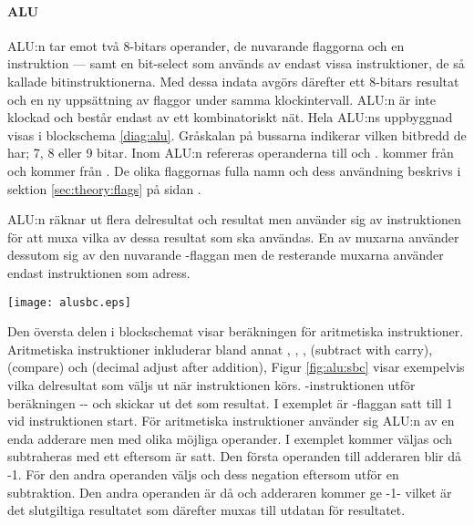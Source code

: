 \documentclass[main.tex]{subfiles}
\begin{document}
\paragraph{ALU}
ALU:n tar emot två 8-bitars operander, de nuvarande flaggorna och en
instruktion --- samt en bit-select som används av endast vissa instruktioner,
de så kallade bitinstruktionerna. Med dessa indata avgörs därefter ett 8-bitars
resultat och en ny uppsättning av flaggor under samma klockintervall. ALU:n är
inte klockad och består endast av ett kombinatoriskt nät. Hela ALU:ns
uppbyggnad visas i blockschema \ref{diag:alu}. Gråskalan på bussarna indikerar
vilken bitbredd de har; 7, 8 eller 9 bitar. Inom ALU:n refereras operanderna
till  och .  kommer från  och
 kommer från . De olika flaggornas fulla namn och dess
användning beskrivs i sektion \ref{sec:theory:flags} på sidan
\pageref{sec:theory:flags}.

ALU:n räknar ut flera delresultat och resultat men använder sig av
instruktionen för att muxa vilka av dessa resultat som ska användas. En av
muxarna använder dessutom sig av den nuvarande -flaggan men de
resterande muxarna använder endast instruktionen som adress.

\begin{SCfigure}
    \centering
    \texttt{[image: alusbc.eps]}
    \caption{Resultat och delresultat som muxas då -instruktionen
    utförs och -flaggan är satt.}
    \label{fig:alu:sbc}
\end{SCfigure}

Den översta delen i blockschemat visar beräkningen för aritmetiska
instruktioner. Aritmetiska instruktioner inkluderar bland annat ,
, ,  (subtract with carry),  (compare)
och  (decimal adjust after addition), Figur \ref{fig:alu:sbc} visar
exempelvis vilka delresultat som väljs ut när instruktionen  körs.
-instruktionen utför beräkningen -- och
skickar ut det som resultat. I exemplet är -flaggan satt till 1 vid
instruktionen start. För aritmetiska instruktioner använder sig ALU:n av en
enda adderare men med olika möjliga operander. I exemplet kommer 
väljas och subtraheras med ett eftersom  är satt. Den första operanden
till adderaren blir då -1. För den andra operanden väljs 
och dess negation eftersom  utför en subtraktion.  Den andra
operanden är då  och adderaren kommer ge -1-
vilket är det slutgiltiga resultatet som därefter muxas till utdatan för
resultatet.
\end{document}
